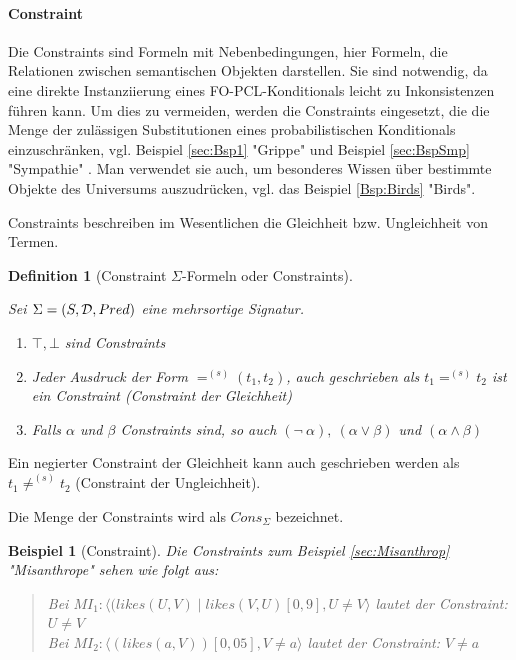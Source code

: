 \documentclass[a4paper, 11pt]{book}
\newtheorem{Def}{Definition }[section]
\newtheorem{Bsp}{Beispiel}[section]
\begin{document}
\paragraph{Constraint}  \label{constraint}

Die Constraints  sind Formeln mit Nebenbedingungen, hier Formeln, die Relationen zwischen semantischen Objekten darstellen. Sie sind notwendig, da eine direkte Instanziierung eines FO-PCL-Konditionals  leicht zu Inkonsistenzen führen kann. Um dies zu vermeiden, werden die Constraints eingesetzt, die die Menge der zulässigen Substitutionen eines probabilistischen Konditionals  einzuschränken, vgl. Beispiel \ref{sec:Bsp1} "{}Grippe"{}  und Beispiel \ref{sec:BspSmp} "{}Sympathie"{} . Man verwendet sie auch, um besonderes Wissen über bestimmte Objekte des Universums auszudrücken, vgl. das Beispiel \ref{Bsp:Birds} "{}Birds"{}.

\noindent
Constraints beschreiben im Wesentlichen die Gleichheit bzw. Ungleichheit von Termen.

\begin{Def}[Constraint $ \Sigma $-Formeln oder Constraints]\cite[Kap. 6.2, S. 126/127 vgl. Def. 6.2.4]{Fis10} \label{Def:Constraint}
		
\noindent
Sei $ \Sigma = (S, {\cal D}, Pred) $ eine mehrsortige Signatur.
\begin{enumerate}
\renewcommand{\labelenumi}{\textnormal{(\theenumi)}}
\item {$ \top, \bot $ sind  Constraints}
\item {Jeder Ausdruck der Form $ =^{(s)} (t_1, t_2)$, auch geschrieben als $ t_1 =^{(s)} t_2 $} ist ein Constraint (Constraint der Gleichheit)
\item{Falls $ \alpha $ und $ \beta $ Constraints sind, so auch $  (\neg ~ \alpha),~  (\alpha \vee \beta)$ und $ (\alpha \wedge \beta)  $} 
\end{enumerate}
\end{Def}
Ein negierter Constraint der Gleichheit kann auch geschrieben werden als $ t_1 \not=^{(s)} t_2 $ (Constraint der Ungleichheit). 

\noindent
Die Menge der Constraints wird als $ Cons_{\Sigma} $  bezeichnet.


\begin{Bsp}[Constraint] \label{Bsp:Constraint}
	Die Constraints zum Beispiel \ref{sec:Misanthrop} "{}Misanthrope"{} sehen wie folgt aus:\\
	\begin{quote}
	Bei	$ MI_1 : \langle (likes(U, V) \mid likes(V, U)[0,9], U \neq V \rangle$ lautet der Constraint: $  U \neq V  $\\
	Bei	$ MI_2 : \langle (likes(a, V))[0,05], V \neq a \rangle$ lautet der Constraint: $  V \neq a  $\\
	\end{quote}
\end{Bsp}
\end{document}
